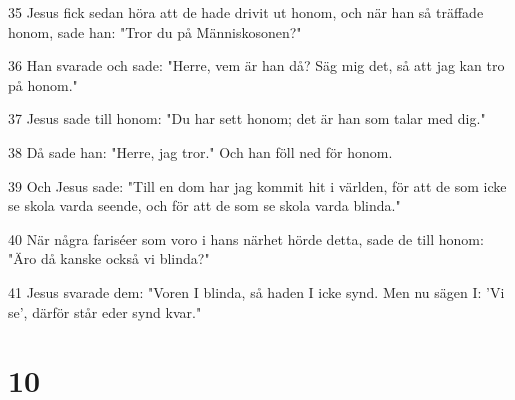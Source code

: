 \par 35 Jesus fick sedan höra att de hade drivit ut honom, och när han så träffade honom, sade han: "Tror du på Människosonen?"
\par 36 Han svarade och sade: "Herre, vem är han då? Säg mig det, så att jag kan tro på honom."
\par 37 Jesus sade till honom: "Du har sett honom; det är han som talar med dig."
\par 38 Då sade han: "Herre, jag tror." Och han föll ned för honom.
\par 39 Och Jesus sade: "Till en dom har jag kommit hit i världen, för att de som icke se skola varda seende, och för att de som se skola varda blinda."
\par 40 När några fariséer som voro i hans närhet hörde detta, sade de till honom: "Äro då kanske också vi blinda?"
\par 41 Jesus svarade dem: "Voren I blinda, så haden I icke synd. Men nu sägen I: 'Vi se', därför står eder synd kvar."

\chapter{10}

